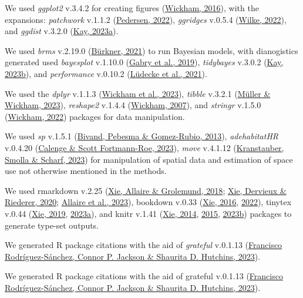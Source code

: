 \documentclass[10pt,a4paper]{article}
\begin{document}
We used \emph{ggplot2} v.3.4.2 for creating figures (\protect\hyperlink{ref-ggplot2}{Wickham, 2016}), with the expansions: \emph{patchwork} v.1.1.2 (\protect\hyperlink{ref-patchwork}{Pedersen, 2022}), \emph{ggridges} v.0.5.4 (\protect\hyperlink{ref-ggridges}{Wilke, 2022}), and \emph{ggdist} v.3.2.0 (\protect\hyperlink{ref-ggdist}{Kay, 2023a}).

We used \emph{brms} v.2.19.0 (\protect\hyperlink{ref-brms}{Bürkner, 2021}) to run Bayesian models, with dianogistics generated used \emph{bayesplot} v.1.10.0 (\protect\hyperlink{ref-bayesplot}{Gabry et al., 2019}), \emph{tidybayes} v.3.0.2 (\protect\hyperlink{ref-tidybayes}{Kay, 2023b}), and \emph{performance} v.0.10.2 (\protect\hyperlink{ref-performance}{Lüdecke et al., 2021}).

We used the \emph{dplyr} v.1.1.3 (\protect\hyperlink{ref-dplyr}{Wickham et al., 2023}), \emph{tibble} v.3.2.1 (\protect\hyperlink{ref-tibble}{Müller \& Wickham, 2023}), \emph{reshape2} v.1.4.4 (\protect\hyperlink{ref-reshape2}{Wickham, 2007}), and \emph{stringr} v.1.5.0 (\protect\hyperlink{ref-stringr}{Wickham, 2022}) packages for data manipulation.

We used \emph{sp} v.1.5.1 (\protect\hyperlink{ref-sp}{Bivand, Pebesma \& Gomez-Rubio, 2013}), \emph{adehabitatHR} v.0.4.20 (\protect\hyperlink{ref-adehabitatHR}{Calenge \& Scott Fortmann-Roe, 2023}), \emph{move} v.4.1.12 (\protect\hyperlink{ref-move}{Kranstauber, Smolla \& Scharf, 2023}) for manipulation of spatial data and estimation of space use not otherwise mentioned in the methods.

We used rmarkdown v.2.25 (\protect\hyperlink{ref-rmarkdown2018}{Xie, Allaire \& Grolemund, 2018}; \protect\hyperlink{ref-rmarkdown2020}{Xie, Dervieux \& Riederer, 2020}; \protect\hyperlink{ref-rmarkdown2023}{Allaire et al., 2023}), bookdown v.0.33 (\protect\hyperlink{ref-bookdown2016}{Xie, 2016}, \protect\hyperlink{ref-R-bookdown}{2022}), tinytex v.0.44 (\protect\hyperlink{ref-tinytex2019}{Xie, 2019}, \protect\hyperlink{ref-tinytex2023}{2023a}), and knitr v.1.41 (\protect\hyperlink{ref-knitr2014}{Xie, 2014}, \protect\hyperlink{ref-knitr2015}{2015}, \protect\hyperlink{ref-knitr2023}{2023b}) packages to generate type-set outputs.

We generated R package citations with the aid of \emph{grateful} v.0.1.13 (\protect\hyperlink{ref-grateful}{Francisco Rodríguez-Sánchez, Connor P. Jackson \& Shaurita D. Hutchins, 2023}).

We generated R package citations with the aid of grateful v.0.1.13 (\protect\hyperlink{ref-grateful}{Francisco Rodríguez-Sánchez, Connor P. Jackson \& Shaurita D. Hutchins, 2023}).
\end{document}
